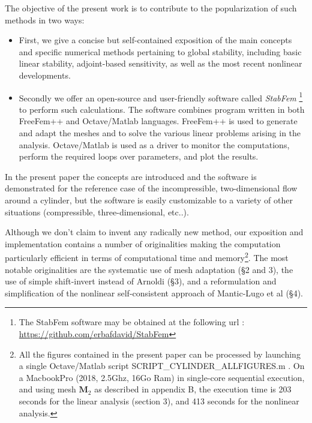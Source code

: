 \documentclass[twocolumn,10pt]{asme2ej}
\begin{document}
The objective of the present work is to contribute to the popularization of such methods 
in two ways:
\begin{itemize}
\item
First, we give a concise but self-contained exposition of the main concepts and 
specific numerical methods pertaining to global stability, including basic linear stability, adjoint-based sensitivity, as well as the most recent nonlinear developments.
\item
Secondly we offer an open-source and user-friendly software called  {\em StabFem} %
\footnote{The StabFem software may be obtained at the following url : \\
\url{https://github.com/erbafdavid/StabFem}
} 
to perform such calculations. The software combines program written in both FreeFem++ and Octave/Matlab languages. 
FreeFem++ is used to generate and adapt the meshes and to solve the various linear problems arising in the analysis. Octave/Matlab is used as a driver to monitor the computations, perform the required loops over parameters, and plot the results.
\end{itemize}

In the present paper the concepts are introduced and the software is demonstrated for the reference case of the incompressible, two-dimensional flow around a cylinder, but the software is easily customizable to a variety of other situations (compressible, three-dimensional, etc..).

Although we don't claim to invent any radically new method, our exposition and implementation contains a number of originalities making the computation particularly efficient in terms of computational time and memory\footnote{All the figures contained in the present paper can be processed by launching a single Octave/Matlab script {\sf SCRIPT\_CYLINDER\_ALLFIGURES.m} . On a MacbookPro (2018,  2.5Ghz, 16Go Ram) in single-core sequential execution,  and using mesh ${\mathbf M}_2$ as described in appendix B, the execution time is 203 seconds for the linear analysis (section 3), and 413 seconds for the nonlinear analysis.}.
The most notable originalities are the systematic use of mesh adaptation (\S 2 and 3), the use of simple shift-invert instead of Arnoldi (\S 3), and a reformulation and simplification of the nonlinear self-consistent approach of Mantic-Lugo et al  (\S 4).
 

\end{document}
